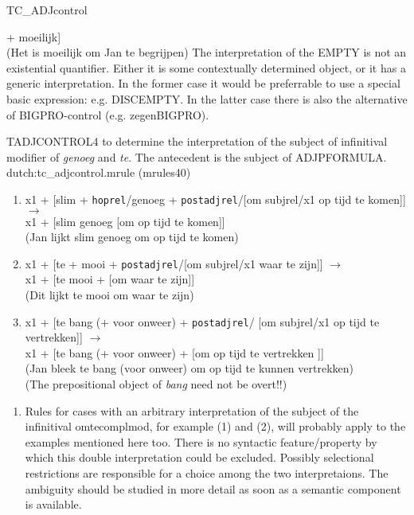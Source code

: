 \begin{mruleclass}{TC\_ADJcontrol}
\begin{members}
\begin{member}
[ het +  x1 (= EMPTYVAR) +  [om Jan te begrijpen] + moeilijk]\\
(Het is moeilijk om Jan te begrijpen)
\remarks\mbox{}
The interpretation of the EMPTY is not an existential quantifier. Either 
it is some
contextually determined object, or it has a generic interpretation.
In the former case it would be preferrable to use a special basic expression: 
e.g. DISCEMPTY. In the latter case there is also the alternative of 
BIGPRO-control (e.g. zegenBIGPRO).  
\end{member}
\begin{member}
 TADJCONTROL4
 to determine the  interpretation 
of the subject of infinitival modifier of {\em genoeg} and {\em te}.
The antecedent is the subject of ADJPFORMULA.
\file dutch:tc\_adjcontrol.mrule (mrules40)
\semantics \nosemantics
\example\mbox{}
\begin{enumerate}
\item
x1 + [slim + {\tt hoprel}/genoeg + 
{\tt postadjrel}/[om subjrel/x1 op tijd te komen]] $\rightarrow$\\
x1 + [slim genoeg [om op tijd te komen]]\\
(Jan lijkt  slim genoeg om op tijd  te komen)
\item
x1 + [te + mooi + {\tt postadjrel}/[om subjrel/x1 waar te zijn]] $\rightarrow$\\
x1 + [te mooi + [om waar te zijn]] \\
(Dit lijkt te mooi om waar te zijn)
\item
 x1 + [te bang (+ voor onweer) + {\tt postadjrel}/
[om subjrel/x1  op tijd te vertrekken]] $\rightarrow$\\
 x1 + [te bang (+ voor onweer) + 
[om op tijd te vertrekken ]]\\
(Jan bleek te bang (voor onweer) om op tijd te kunnen vertrekken)\\
(The prepositional object of {\em bang} need not be overt!!)
\end{enumerate}
\remarks\mbox{}
\begin{enumerate} 
  \item

Rules for cases with an arbitrary interpretation of the subject of the 
infinitival omtecomplmod, for example (1) and (2), 
will probably apply to the examples mentioned here too.
There is no syntactic feature/property by which this double interpretation 
could be excluded. Possibly selectional restrictions are responsible for a 
choice among the two interpretaions. The ambiguity should be studied in more 
detail as soon as a semantic component is available.


\end{enumerate}
\end{member}
\end{members}
\end{mruleclass}
